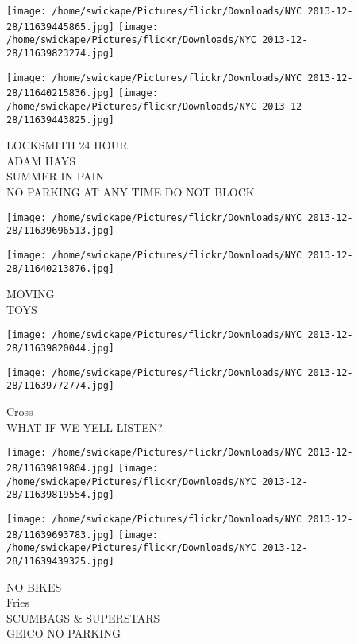 \documentclass[10pt,letterpaper]{article}
\begin{document}
\texttt{[image: /home/swickape/Pictures/flickr/Downloads/NYC 2013-12-28/11639445865.jpg]}
\texttt{[image: /home/swickape/Pictures/flickr/Downloads/NYC 2013-12-28/11639823274.jpg]}

\texttt{[image: /home/swickape/Pictures/flickr/Downloads/NYC 2013-12-28/11640215836.jpg]}
\texttt{[image: /home/swickape/Pictures/flickr/Downloads/NYC 2013-12-28/11639443825.jpg]}

LOCKSMITH 24 HOUR\\
ADAM HAYS\\
SUMMER IN PAIN\\
NO PARKING AT ANY TIME DO NOT BLOCK\\
\pagebreak

\texttt{[image: /home/swickape/Pictures/flickr/Downloads/NYC 2013-12-28/11639696513.jpg]}

\vspace{0.25in}
\texttt{[image: /home/swickape/Pictures/flickr/Downloads/NYC 2013-12-28/11640213876.jpg]}

MOVING\\
TOYS\\
\pagebreak

\texttt{[image: /home/swickape/Pictures/flickr/Downloads/NYC 2013-12-28/11639820044.jpg]}

\vspace{0.25in}
\texttt{[image: /home/swickape/Pictures/flickr/Downloads/NYC 2013-12-28/11639772774.jpg]}

Cross\\
WHAT IF WE YELL LISTEN?\\
\pagebreak

\texttt{[image: /home/swickape/Pictures/flickr/Downloads/NYC 2013-12-28/11639819804.jpg]}
\texttt{[image: /home/swickape/Pictures/flickr/Downloads/NYC 2013-12-28/11639819554.jpg]}

\texttt{[image: /home/swickape/Pictures/flickr/Downloads/NYC 2013-12-28/11639693783.jpg]}
\texttt{[image: /home/swickape/Pictures/flickr/Downloads/NYC 2013-12-28/11639439325.jpg]}

NO BIKES\\
Fries\\
SCUMBAGS \& SUPERSTARS\\
GEICO NO PARKING\\
\pagebreak
\end{document}
